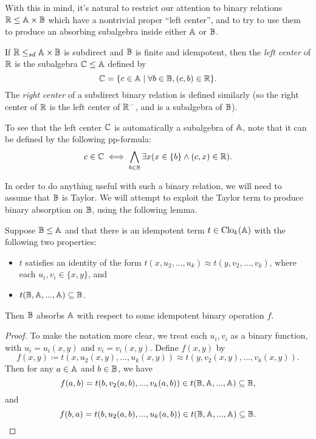 \documentclass[letterpaper,11pt]{article}
\DeclareMathOperator{\Clo}{Clo}
\begin{document}
With this in mind, it's natural to restrict our attention to binary relations $\mathbb{R} \le \mathbb{A} \times \mathbb{B}$ which have a nontrivial proper ``left center'', and to try to use them to produce an absorbing subalgebra inside either $\mathbb{A}$ or $\mathbb{B}$.

\begin{defn} If $\mathbb{R} \le_{sd} \mathbb{A} \times \mathbb{B}$ is subdirect and $\mathbb{B}$ is finite and idempotent, then the \emph{left center} of $\mathbb{R}$ is the subalgebra $\mathbb{C} \le \mathbb{A}$ defined by
\[
\mathbb{C} = \{c \in \mathbb{A} \mid \forall b \in \mathbb{B}, (c,b) \in \mathbb{R}\}.
\]
The \emph{right center} of a subdirect binary relation is defined similarly (so the right center of $\mathbb{R}$ is the left center of $\mathbb{R}^-$, and is a subalgebra of $\mathbb{B}$).
\end{defn}

To see that the left center $\mathbb{C}$ is automatically a subalgebra of $\mathbb{A}$, note that it can be defined by the following pp-formula:
\[
c \in \mathbb{C} \iff \bigwedge_{b \in \mathbb{B}} \exists x (x \in \{b\} \wedge (c,x) \in \mathbb{R}).
\]

In order to do anything useful with such a binary relation, we will need to assume that $\mathbb{B}$ is Taylor. We will attempt to exploit the Taylor term to produce binary absorption on $\mathbb{B}$, using the following lemma.

\begin{lem} Suppose $\mathbb{B} \le \mathbb{A}$ and that there is an idempotent term $t \in \Clo_k(\bA)$ with the following two properties:
\begin{itemize}
\item $t$ satisfies an identity of the form $t(x,u_2,...,u_k) \approx t(y,v_2,...,v_k)$, where each $u_i,v_i \in \{x,y\}$, and
\item $t(\mathbb{B}, \mathbb{A}, ..., \mathbb{A}) \subseteq \mathbb{B}$.
\end{itemize}
Then $\mathbb{B}$ absorbs $\mathbb{A}$ with respect to some idempotent binary operation $f$.
\end{lem}
\begin{proof} To make the notation more clear, we treat each $u_i,v_i$ as a binary function, with $u_i = u_i(x,y)$ and $v_i = v_i(x,y)$. Define $f(x,y)$ by
\[
f(x,y) \coloneqq t(x,u_2(x,y),...,u_k(x,y)) \approx t(y,v_2(x,y),...,v_k(x,y)).
\]
Then for any $a \in \mathbb{A}$ and $b \in \mathbb{B}$, we have
\[
f(a,b) = t(b,v_2(a,b),...,v_k(a,b)) \in t(\mathbb{B},\mathbb{A},...,\mathbb{A}) \subseteq \mathbb{B},
\]
and
\[
f(b,a) = t(b,u_2(a,b),...,u_k(a,b)) \in t(\mathbb{B},\mathbb{A},...,\mathbb{A}) \subseteq \mathbb{B}.\qedhere
\]
\end{proof}
\end{document}
